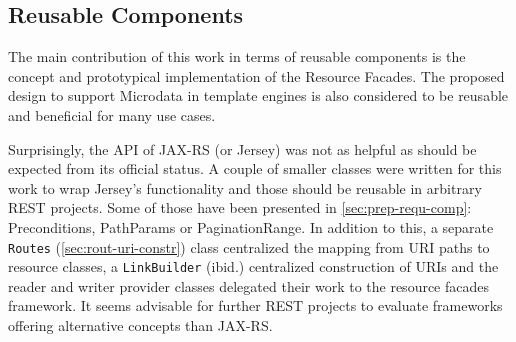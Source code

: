 \documentclass[11pt,a4paper,headsepline,twoside]{scrartcl}		%
\begin{document}
\subsection{Reusable Components}
\label{sec:reusable-components}

The main contribution of this work in terms of reusable components is the
concept and prototypical implementation of the Resource Facades. The proposed
design to support Microdata in template engines is also considered to be
reusable and beneficial for many use cases.

Surprisingly, the API of JAX-RS (or Jersey) was not as helpful as should be
expected from its official status. A couple of smaller classes were written for
this work to wrap Jersey's functionality and those should be reusable in
arbitrary REST projects. Some of those have been presented in
\autoref{sec:prep-requ-comp}: Preconditions, PathParams or PaginationRange. In
addition to this, a separate \lstinline:Routes: (\autoref{sec:rout-uri-constr})
class centralized the mapping from URI paths to resource classes, a
\lstinline:LinkBuilder: (ibid.) centralized construction of URIs and the reader
and writer provider classes delegated their work to the resource facades
framework. It seems advisable for further REST projects to evaluate frameworks
offering alternative concepts than JAX-RS.




\end{document}
